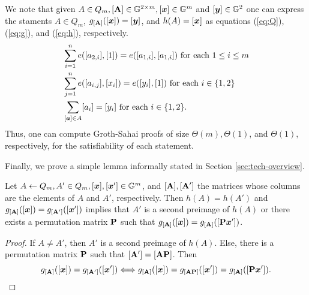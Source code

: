 We note that given $A\in Q_m,[\mathbf{{A}}]\in\mathbb{G}^{2\times m},[{\boldsymbol{x}}]\in\mathbb{G}^m$ and $[{\boldsymbol{y}}]\in\mathbb{G}^2$ one can express the staments $A\in Q_m$, $g_{[\mathbf{{A}}]}([{\boldsymbol{x}}])=[{\boldsymbol{y}}]$, and $h(A)=[{\boldsymbol{x}}]$ as equations (\ref{eq:Q}),(\ref{eq:g}), and (\ref{eq:h}), respectively.
 \begin{align}
&\sum_{i=1}^n e([a_{2,i}],[1])=e([a_{1,i}],[a_{1,i}]) \text{ for each } 1\leq i\leq m \label{eq:Q}\\
&\sum_{j=1}^n e([a_{i,j}],[x_i]) = e([y_i],[1]) \text{ for each } i\in\{1,2\} \label{eq:g}\\
&\sum_{[{\boldsymbol{a}}]\in A} [a_i] = [y_i] \text{ for each } i\in\{1,2\}.\label{eq:h}
\end{align}
Thus, one can compute Groth-Sahai proofs of size $\Theta(m),\Theta(1)$, and $\Theta(1)$, respectively, for the satisfiability of each statement.

Finally, we prove a simple lemma informally stated in Section \ref{sec:tech-overview}.
\begin{lemma}\label{lemma:hg}
Let $A\gets Q_m,A'\in Q_m,[{\boldsymbol{x}}],[{\boldsymbol{x}}']\in\mathbb{G}^m$, and $[\mathbf{{A}}],[\mathbf{{A}}']$ the matrices whose columns are the elements of $A$ and $A'$, respectively. Then $h(A)=h(A')$ and $g_{[\mathbf{{A}}]}([{\boldsymbol{x}}])=g_{[\mathbf{{A}}']}([{\boldsymbol{x}}'])$ implies that $A'$ is a second preimage of $h(A)$ or there exists a permutation matrix $\mathbf{{P}}$ such that $g_{[\mathbf{{A}}]}([{\boldsymbol{x}}])=g_{[\mathbf{{A}}]}([\mathbf{{P}}{\boldsymbol{x}}'])$.
\end{lemma}
\begin{proof}
If $A\neq A'$, then $A'$ is a second preimage of $h(A)$. Else, there is a permutation matrix $\mathbf{{P}}$ such that $[\mathbf{{A}}'] =[\mathbf{{A}}\mathbf{{P}}]$. Then
$$
 g_{[\mathbf{{A}}]}([{\boldsymbol{x}}])=g_{[\mathbf{{A}}']}([{\boldsymbol{x}}'])\Longleftrightarrow  g_{[\mathbf{{A}}]}([{\boldsymbol{x}}])=g_{[\mathbf{{A}}\mathbf{{P}}]}([{\boldsymbol{x}}'])=g_{[\mathbf{{A}}]}([\mathbf{{P}}{\boldsymbol{x}}']).
$$
\end{proof}